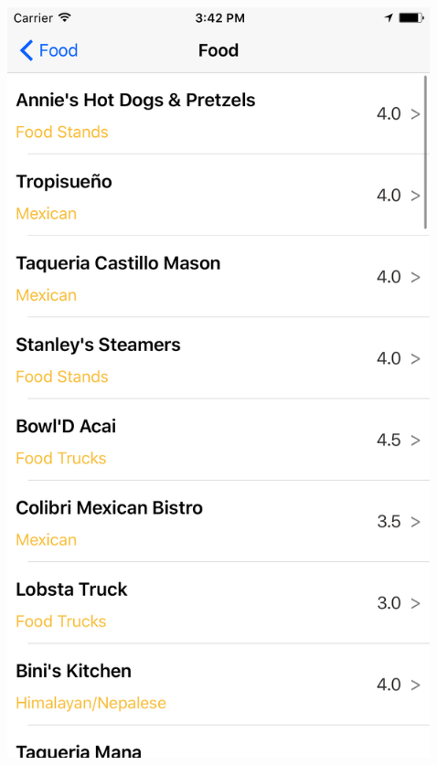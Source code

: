 \documentclass{beamer}
\begin{document}
\begin{frame}
\begin{columns}
\begin{column}{0.3\textwidth}
    \end{column}
    \begin{column}{0.3\textwidth}  %
        \begin{center}
            \includegraphics[scale=0.08]{foodTable}
        \end{center}
    \end{column}
    \begin{column}{0.3\textwidth}  %
        \begin{center}

\end{center}
\end{column}
\end{columns}
\end{frame}
\end{document}

